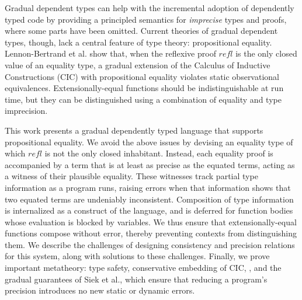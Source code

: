 
Gradual dependent types can help with the incremental adoption of dependently typed code by providing a principled semantics for \textit{imprecise} types and proofs, where some parts have been omitted.
Current theories of gradual dependent types, though,  lack a central feature of type theory: propositional equality.
Lennon-Bertrand et al. show that, when the reflexive proof $\mathit{refl}$ is the only closed
value of an equality type, a gradual extension of the Calculus of Inductive Constructions (CIC) with propositional equality violates static observational equivalences.
Extensionally-equal functions should be indistinguishable at run time, but
they can be distinguished using
 a combination of equality and type imprecision.

This work presents a gradual dependently typed language that supports propositional equality.
We avoid the above issues by devising an equality type of which $\mathit{refl}$
is not the only closed inhabitant.
Instead, each equality proof is accompanied by a term that is at least as precise
as the equated terms, acting as a witness of their plausible equality.
These witnesses track partial type information as a program runs, raising errors
when that information shows that two equated terms are undeniably inconsistent.
Composition of type information is internalized as a construct of the language,
and is deferred for function bodies whose evaluation is blocked by variables.
We thus ensure that extensionally-equal functions compose without error,
thereby preventing contexts from distinguishing them.
We describe the challenges of designing consistency and precision relations
for this system, along with solutions to these challenges. Finally, we prove important metatheory: type safety, conservative embedding of CIC,
, and the gradual guarantees of Siek et al., which ensure that
reducing a program's precision introduces no new static or dynamic errors.
